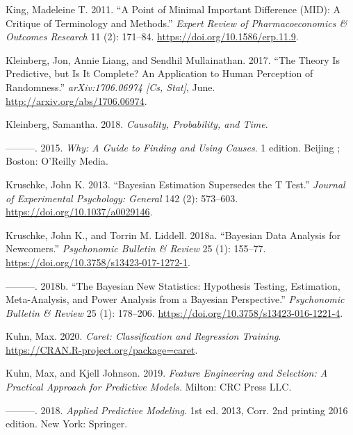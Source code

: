 \documentclass[
]{book}
\newlength{\cslhangindent}
\newenvironment{cslreferences}%
  {\setlength{\parindent}{0pt}%
  \everypar{\setlength{\hangindent}{\cslhangindent}}\ignorespaces}%
  {\par}
\begin{document}
\begin{cslreferences}
\leavevmode\hypertarget{ref-kingPointMinimalImportant2011}{}%
King, Madeleine T. 2011. ``A Point of Minimal Important Difference (MID): A Critique of Terminology and Methods.'' \emph{Expert Review of Pharmacoeconomics \& Outcomes Research} 11 (2): 171--84. \url{https://doi.org/10.1586/erp.11.9}.

\leavevmode\hypertarget{ref-kleinbergTheoryPredictiveIt2017}{}%
Kleinberg, Jon, Annie Liang, and Sendhil Mullainathan. 2017. ``The Theory Is Predictive, but Is It Complete? An Application to Human Perception of Randomness.'' \emph{arXiv:1706.06974 {[}Cs, Stat{]}}, June. \url{http://arxiv.org/abs/1706.06974}.

\leavevmode\hypertarget{ref-kleinbergCausalityProbabilityTime2018}{}%
Kleinberg, Samantha. 2018. \emph{Causality, Probability, and Time}.

\leavevmode\hypertarget{ref-kleinbergWhyGuideFinding2015}{}%
---------. 2015. \emph{Why: A Guide to Finding and Using Causes}. 1 edition. Beijing ; Boston: O'Reilly Media.

\leavevmode\hypertarget{ref-kruschkeBayesianEstimationSupersedes2013}{}%
Kruschke, John K. 2013. ``Bayesian Estimation Supersedes the T Test.'' \emph{Journal of Experimental Psychology: General} 142 (2): 573--603. \url{https://doi.org/10.1037/a0029146}.

\leavevmode\hypertarget{ref-kruschkeBayesianDataAnalysis2018}{}%
Kruschke, John K., and Torrin M. Liddell. 2018a. ``Bayesian Data Analysis for Newcomers.'' \emph{Psychonomic Bulletin \& Review} 25 (1): 155--77. \url{https://doi.org/10.3758/s13423-017-1272-1}.

\leavevmode\hypertarget{ref-kruschkeBayesianNewStatistics2018}{}%
---------. 2018b. ``The Bayesian New Statistics: Hypothesis Testing, Estimation, Meta-Analysis, and Power Analysis from a Bayesian Perspective.'' \emph{Psychonomic Bulletin \& Review} 25 (1): 178--206. \url{https://doi.org/10.3758/s13423-016-1221-4}.

\leavevmode\hypertarget{ref-R-caret}{}%
Kuhn, Max. 2020. \emph{Caret: Classification and Regression Training}. \url{https://CRAN.R-project.org/package=caret}.

\leavevmode\hypertarget{ref-kuhnFeatureEngineeringSelection2019}{}%
Kuhn, Max, and Kjell Johnson. 2019. \emph{Feature Engineering and Selection: A Practical Approach for Predictive Models.} Milton: CRC Press LLC.

\leavevmode\hypertarget{ref-kuhnAppliedPredictiveModeling2018}{}%
---------. 2018. \emph{Applied Predictive Modeling}. 1st ed. 2013, Corr. 2nd printing 2016 edition. New York: Springer.


\end{cslreferences}
\end{document}
